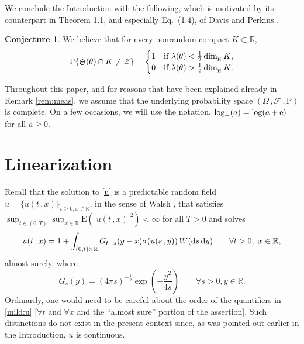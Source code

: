 \documentclass[reqno]{amsart}
\DeclareMathOperator{\dimh}{dim_{_{\rm H}}}
\DeclareMathOperator{\fS}{\mathfrak S}
\newcommand{\<}{\langle}
\renewcommand{\>}{\rangle}
\newcommand{\R}{\mathbb{R}}
\renewcommand{\P}{\mathrm{P}}
\newcommand{\E}{\mathrm{E}}
\newcommand{\1}{\mathbb{1}}
\renewcommand{\d}{{\rm d}}
\newcommand{\e}{{\rm e}}
\renewcommand{\ge}{\geqslant}
\theoremstyle{definition}
\newtheorem{conjecture}[stat]{Conjecture}
\numberwithin{equation}{section}
\begin{document}
We conclude the Introduction with the following, which is motivated by 
its counterpart in Theorem 1.1, and especially Eq.~(1.4), of 
Davis and Perkins \cite{DavisPerkins}.

\begin{conjecture}
	We believe that for every nonrandom compact $K\subset\R$,
		\[
			\P\{\fS(\theta)\cap K\neq\varnothing\}=
			\begin{cases}
				1 & \text{if $\lambda(\theta) < \frac12\dimh K$},\\
				0 & \text{if $\lambda(\theta) > \frac12\dimh K$}.
			\end{cases}
		\]
\end{conjecture}

Throughout this paper, and for reasons that have been explained already
in Remark \ref{rem:meas},
we assume that the 
underlying probability space $(\Omega\,,\mathscr{F}\,,\P)$
is complete. On a few occasions, we will use the notation,
$\log_+(a)=\log(a+\e)$ for all $a\ge0$.

\section{Linearization}

Recall that the solution to \eqref{u} is a predictable random field
$u=\{u(t\,,x)\}_{t\ge0,x\in\R}$,
in the sense of Walsh \cite{Walsh},
that satisfies $\sup_{t\in(0,T)}\sup_{x\in\R}\E(|u(t\,,x)|^2)<\infty$ for all $T>0$ and 
solves
\begin{equation}\label{mild:u}
	u(t\,,x) = 1 + \int_{(0,t)\times\R} G_{t-s}(y-x)\sigma(u(s\,,y))\,W(\d s\,\d y)
	\qquad\forall t>0,\ x\in\R,
\end{equation}
almost surely, where 
\begin{equation}\label{G}
	G_s(y) = (4\pi s)^{-\frac{1}{2}}\exp\left( - \frac{y^2}{4s}\right)\qquad\forall s > 0, y \in \R.
\end{equation}
Ordinarily, one would need to be careful about the order of
the quantifiers in \eqref{mild:u} 
[$\forall t$ and $\forall x$ and the ``almost sure'' portion of the assertion].
Such distinctions do not exist in the present context since, as was pointed out earlier
in the Introduction, $u$ is continuous.
\end{document}
